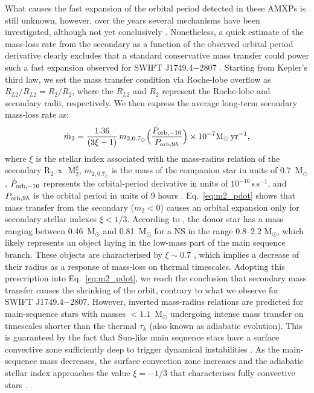\documentclass[fleqn,usenatbib]{mnras}
\newcommand{\swiftj}{SWIFT J1749.4$-$2807}
\begin{document}
What causes the fast expansion of the orbital period detected in these AMXPs is still unknown, however, over the years several mechanisms have been investigated, although not yet conclusively \citep[see e.g.,][]{di-Salvo:2008uu, Hartman:2008uj,Burderi:2009td, Patruno:2012tw, Sanna:2017vj, Sanna:2018tx}. Nonetheless, a quick estimate of the mass-loss rate from the secondary as a function of the observed orbital period derivative clearly excludes that a standard conservative mass transfer could power such a fast expansion observed for \swiftj{} \citep[similar conclusions have been drawn for SAX J1808.4$-$3658, see e.g.,][]{Sanna:2017vj}. Starting from Kepler's third law, we set the mass transfer condition via Roche-lobe overflow as $\dot{R}_{L2}/R_{L2}=\dot{R}_2/R_{2}$, where the $R_{L2}$ and $R_{2}$ represent the Roche-lobe and secondary radii, respectively. We then express the average long-term secondary mass-loss rate as: 
\begin{eqnarray}
\label{eq:m2_pdot}
\dot{m}_{2}=\frac{1.36}{(3\xi-1)}\,m_{2,0.7_{\odot{}}}\Big(\frac{\dot{P}_{{\rm orb},-10}}{P_{{\rm orb},9h}}\Big)\times 10^{-7} \text{M}_{\odot}\, \text{yr}^{-1} ,
\end{eqnarray}
where $\xi$ is the stellar index associated with the mass-radius relation of the secondary R$_2\propto$ M$_2^\xi$, $m_{2,0.7_\odot{}}$ is the mass of the companion star in units of 0.7~M$_{\odot}$, $\dot{P}_{{\rm orb},-10}$ represents the orbital-period derivative in units of $10^{-10}\,\text{s}\,\text{s}^{-1}$, and $P_{{\rm orb},9h}$ is the orbital period in units of 9 hours \citep[see e.g.,][for more details on the derivation of the expression]{Burderi:2010tk}. Eq.~\ref{eq:m2_pdot} shows that mass transfer from the secondary ($\dot{m}_{2} < 0$) causes an orbital expansion only for secondary stellar indexes $\xi<1/3$. According to \citet{Markwardt:2010tl}, the donor star has a mass ranging between 0.46~M$_\odot$ and 0.81~M$_\odot$ for a NS in the range 0.8--2.2 M$_\odot$, which likely represents an object laying in the low-mass part of the main sequence branch. These objects are characterised by $\xi\sim0.7$ \citep[see e.g.,][]{Chabrier:2009vh}, which implies a decrease of their radius as a response of mass-loss on thermal timescales. Adopting this prescription into Eq.~\ref{eq:m2_pdot}, we reach the conclusion that secondary mass transfer causes the shrinking of the orbit, contrary to what we observe for \swiftj{}. However, inverted mass-radius relations are predicted for main-sequence stars with masses $<1.1$~M$_{\odot}$ undergoing intense mass transfer on timescales shorter than the thermal $\tau_k$ (also known as adiabatic evolution). This is guaranteed by the fact that Sun-like main sequence stars have a surface convective zone sufficiently deep to trigger dynamical instabilities \citep[see e.g.,][]{Ge:2015ug}. As the main-sequence mass decreases, the surface convection zone increases and the adiabatic stellar index approaches the value $\xi=-1/3$ that characterises fully convective stars \citep[well described with an n=3/2 polytrope, see e.g.,][]{Rappaport:1982vc}. 
\end{document}
